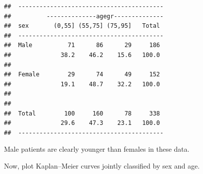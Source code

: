 \documentclass[
]{book}
\newenvironment{Shaded}{\begin{snugshade}}{\end{snugshade}}
\newcommand{\AttributeTok}[1]{\textcolor[rgb]{0.13,0.29,0.53}{#1}}
\newcommand{\ConstantTok}[1]{\textcolor[rgb]{0.56,0.35,0.01}{#1}}
\newcommand{\DecValTok}[1]{\textcolor[rgb]{0.00,0.00,0.81}{#1}}
\newcommand{\FunctionTok}[1]{\textcolor[rgb]{0.13,0.29,0.53}{\textbf{#1}}}
\newcommand{\NormalTok}[1]{#1}
\newcommand{\OtherTok}[1]{\textcolor[rgb]{0.56,0.35,0.01}{#1}}
\newcommand{\SpecialCharTok}[1]{\textcolor[rgb]{0.81,0.36,0.00}{\textbf{#1}}}
\begin{document}
\begin{Shaded}
\end{Shaded}

\begin{verbatim}
##  ----------------------------------------- 
##          --------------agegr-------------- 
##  sex       (0,55] (55,75] (75,95]   Total  
##  ----------------------------------------- 
##  Male          71      86      29     186  
##              38.2    46.2    15.6   100.0  
##                                            
##  Female        29      74      49     152  
##              19.1    48.7    32.2   100.0  
##                                            
##                                            
##  Total        100     160      78     338  
##              29.6    47.3    23.1   100.0  
##  -----------------------------------------
\end{verbatim}

Male patients are clearly younger than females in these data.

Now, plot Kaplan--Meier curves jointly classified by sex and age.
\end{document}
